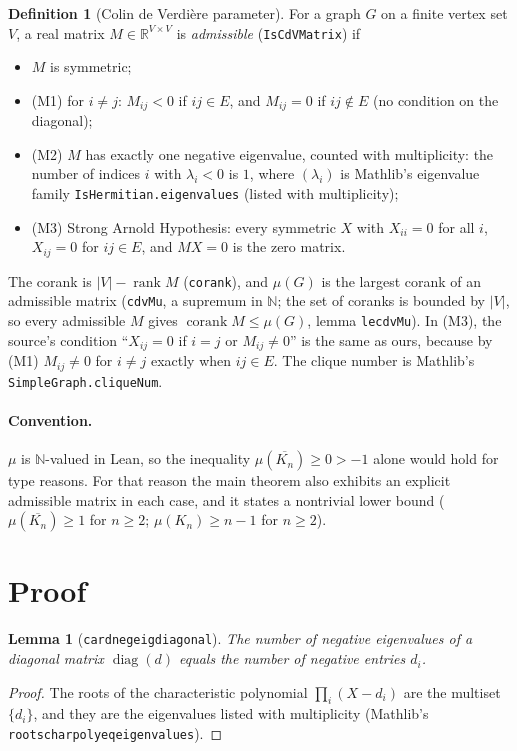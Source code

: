 \documentclass[11pt]{article}
\renewcommand{\_}{\oldus\allowbreak}
\newtheorem{lemma}[theorem]{Lemma}
\theoremstyle{definition}
\newtheorem{definition}[theorem]{Definition}
\theoremstyle{remark}
\begin{document}
\begin{definition}[Colin de Verdi\`ere parameter]
For a graph $G$ on a finite vertex set $V$, a real matrix $M\in\mathbb{R}^{V\times V}$ is
\emph{admissible} (\texttt{IsCdVMatrix}) if
\begin{itemize}
\item $M$ is symmetric;
\item (M1) for $i\ne j$: $M_{ij}<0$ if $ij\in E$, and $M_{ij}=0$ if $ij\notin E$ (no condition on the
  diagonal);
\item (M2) $M$ has exactly one negative eigenvalue, counted with multiplicity: the number of indices
  $i$ with $\lambda_i<0$ is $1$, where $(\lambda_i)$ is Mathlib's eigenvalue family
  \texttt{IsHermitian.eigenvalues} (listed with multiplicity);
\item (M3) Strong Arnold Hypothesis: every symmetric $X$ with $X_{ii}=0$ for all $i$, $X_{ij}=0$ for
  $ij\in E$, and $MX=0$ is the zero matrix.
\end{itemize}
The corank is $|V|-\operatorname{rank}M$ (\texttt{corank}), and $\mu(G)$ is the largest corank of an
admissible matrix (\texttt{cdvMu}, a supremum in $\mathbb{N}$; the set of coranks is bounded by $|V|$,
so every admissible $M$ gives $\operatorname{corank}M\le\mu(G)$, lemma \texttt{le\_cdvMu}). In (M3),
the source's condition ``$X_{ij}=0$ if $i=j$ or $M_{ij}\ne0$'' is the same as ours, because by (M1)
$M_{ij}\ne0$ for $i\ne j$ exactly when $ij\in E$. The clique number is Mathlib's
\texttt{SimpleGraph.cliqueNum}.
\end{definition}

\paragraph{Convention.} $\mu$ is $\mathbb{N}$-valued in Lean, so the inequality
$\mu(\overline{K_n})\ge0>-1$ alone would hold for type reasons. For that reason the main theorem also
exhibits an explicit admissible matrix in each case, and it states a nontrivial lower bound
($\mu(\overline{K_n})\ge1$ for $n\ge2$; $\mu(K_n)\ge n-1$ for $n\ge 2$).

\section{Proof}

\begin{lemma}[\texttt{card\_neg\_eig\_diagonal}]
The number of negative eigenvalues of a diagonal matrix $\operatorname{diag}(d)$ equals the number of
negative entries $d_i$.
\end{lemma}
\begin{proof}
The roots of the characteristic polynomial $\prod_i(X-d_i)$ are the multiset $\{d_i\}$, and they are
the eigenvalues listed with multiplicity (Mathlib's \texttt{roots\_charpoly\_eq\_eigenvalues}).
\end{proof}
\end{document}
